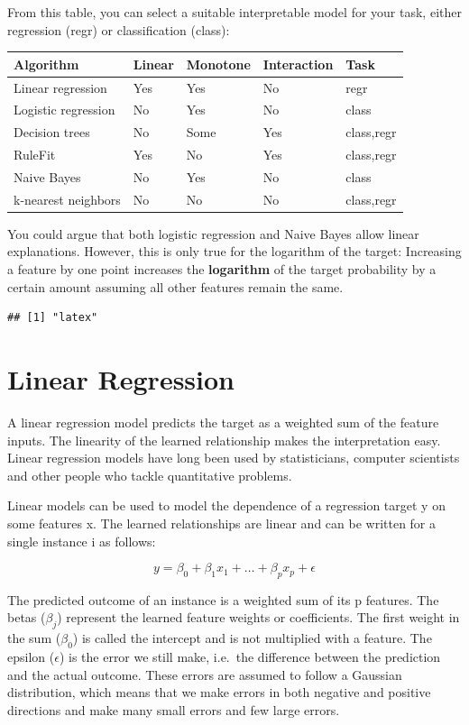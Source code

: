\documentclass[
  11pt,
]{scrbook}
\begin{document}
From this table, you can select a suitable interpretable model for your task, either regression (regr) or classification (class):

\begin{longtable}[]{@{}lllll@{}}
\toprule
Algorithm & Linear & Monotone & Interaction & Task\tabularnewline
\midrule
\endhead
Linear regression & Yes & Yes & No & regr\tabularnewline
Logistic regression & No & Yes & No & class\tabularnewline
Decision trees & No & Some & Yes & class,regr\tabularnewline
RuleFit & Yes & No & Yes & class,regr\tabularnewline
Naive Bayes & No & Yes & No & class\tabularnewline
k-nearest neighbors & No & No & No & class,regr\tabularnewline
\bottomrule
\end{longtable}

You could argue that both logistic regression and Naive Bayes allow linear explanations.
However, this is only true for the logarithm of the target: Increasing a feature by one point increases the \textbf{logarithm} of the target probability by a certain amount assuming all other features remain the same.

\begin{verbatim}
## [1] "latex"
\end{verbatim}

\newpage

\hypertarget{limo}{%
\section{Linear Regression}\label{limo}}

A linear regression model predicts the target as a weighted sum of the feature inputs.
The linearity of the learned relationship makes the interpretation easy.
Linear regression models have long been used by statisticians, computer scientists and other people who tackle quantitative problems.

Linear models can be used to model the dependence of a regression target y on some features x.
The learned relationships are linear and can be written for a single instance i as follows:

\[y=\beta_{0}+\beta_{1}x_{1}+\ldots+\beta_{p}x_{p}+\epsilon\]

The predicted outcome of an instance is a weighted sum of its p features.
The betas (\(\beta_{j}\)) represent the learned feature weights or coefficients.
The first weight in the sum (\(\beta_0\)) is called the intercept and is not multiplied with a feature.
The epsilon (\(\epsilon\)) is the error we still make, i.e.~the difference between the prediction and the actual outcome.
These errors are assumed to follow a Gaussian distribution, which means that we make errors in both negative and positive directions and make many small errors and few large errors.
\end{document}
